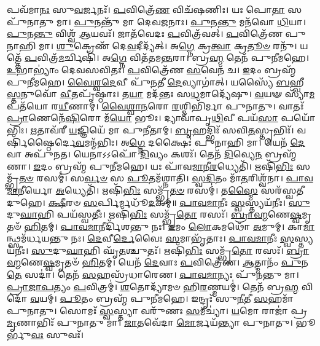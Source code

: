 𑌪𑌵᳴𑌮𑌾\-\ul{𑌨𑌃} 𑌸𑍁\-\ul{𑌵}\-𑌰𑍍𑌜𑌨𑌃᳴। \ul{𑌪}\-𑌵𑌿𑌤𑍍𑌰𑍇᳴\-\ul{𑌣} 𑌵𑌿𑌚᳴\ur{}𑌷𑌣𑌿𑌃। 𑌯𑌃 𑌪𑍋\-\ul{𑌤𑌾} 𑌸 𑌪𑍁᳴𑌨𑌾𑌤𑍁 𑌮𑌾। \ul{𑌪𑍁}\-𑌨𑌨𑍍𑌤𑍁᳴ 𑌮𑌾 𑌦𑍇𑌵\-\ul{𑌜}\-𑌨𑌾𑌃।
\-\ul{𑌪𑍁}\-𑌨\-\ul{𑌨𑍍𑌤𑍁} 𑌮𑌨᳴𑌵𑍋 \ul{𑌧𑌿}\-𑌯𑌾। \ul{𑌪𑍁}\-𑌨\-\ul{𑌨𑍍𑌤𑍁} 𑌵𑌿𑌶𑍍𑌵᳴ \ul{𑌆}\-𑌯𑌵𑌃᳴। 𑌜𑌾𑌤᳴𑌵𑍇𑌦𑌃 \ul{𑌪}\-𑌵𑌿𑌤𑍍𑌰᳴𑌵𑌤𑍍। \ul{𑌪}\-𑌵𑌿𑌤𑍍𑌰𑍇᳴𑌣 𑌪𑍁𑌨𑌾𑌹𑌿 𑌮𑌾।
\-\ul{𑌶𑍁}\-𑌕𑍍𑌰𑍇𑌣᳴ 𑌦𑍇\-\ul{𑌵}\-𑌦𑍀𑌦𑍍𑌯᳴𑌤𑍍। 𑌅\-\ul{𑌗𑍍𑌨𑍇} 𑌕𑍍𑌰\-\ul{𑌤𑍍𑌵𑌾} 𑌕𑍍𑌰\-\ul{𑌤𑍂}\-\-\ul{𑍞} 𑌰𑌨𑍁᳴। 𑌯𑌤𑍍𑌤𑍇᳴ \ul{𑌪}\-𑌵𑌿𑌤𑍍𑌰᳴\-\ul{𑌮}\-𑌰𑍍𑌚𑌿𑌷𑌿᳴। 𑌅\-\ul{𑌗𑍍𑌨𑍇} 𑌵𑌿𑌤᳴𑌤𑌮\-\ul{𑌨𑍍𑌤}\-𑌰𑌾।
𑌬𑍍𑌰\-\ul{𑌹𑍍𑌮} 𑌤𑍇𑌨᳴ 𑌪𑍁𑌨𑍀𑌮𑌹𑍇। \ul{𑌉}\-𑌭𑌾𑌭𑍍𑌯𑌾𑌂॑ 𑌦𑍇𑌵𑌸𑌵𑌿𑌤𑌃। \ul{𑌪}\-𑌵𑌿𑌤𑍍𑌰𑍇᳴𑌣 \ul{𑌸}\-𑌵𑍇𑌨᳴ 𑌚। \ul{𑌇}\-𑌦𑌂 𑌬𑍍𑌰𑌹𑍍𑌮᳴ 𑌪𑍁𑌨𑍀𑌮𑌹𑍇।
\-\ul{𑌵𑍈}\-\-\ul{𑌶𑍍𑌵}\-\-\ul{𑌦𑍇}\-𑌵𑍀 𑌪𑍁᳴\-\ul{𑌨}\-𑌤𑍀 \ul{𑌦𑍇}\-𑌵𑍍𑌯𑌾𑌗𑌾॑𑌤𑍍। 𑌯𑌸𑍍𑌯𑍈᳴ \ul{𑌬}\-𑌹𑍍𑌵𑍀\-\ul{𑌸𑍍𑌤}\-𑌨𑍁𑌵𑍋᳴ \ul{𑌵𑍀}\-𑌤𑌪𑍃᳴𑌷𑍍𑌠𑌾𑌃।
𑌤\-\ul{𑌯𑌾} 𑌮𑌦᳴𑌨𑍍𑌤𑌃 𑌸\-\ul{𑌧}\-𑌮𑌾𑌦𑍍𑌯𑍇᳴𑌷𑍁। \ul{𑌵}\-𑌯𑍟 𑌸𑍍𑌯𑌾᳴\-\ul{𑌮} 𑌪𑌤᳴𑌯𑍋 𑌰\-\ul{𑌯𑍀}\-𑌣𑌾𑌮𑍍।
\-\ul{𑌵𑍈}\-\-\ul{𑌶𑍍𑌵𑌾}\-\-\ul{𑌨}\-𑌰𑍋 \ul{𑌰}\-𑌶𑍍𑌮𑌿𑌭𑌿᳴𑌰𑍍𑌮𑌾 𑌪𑍁𑌨𑌾𑌤𑍁। 𑌵𑌾𑌤𑌃᳴ \ul{𑌪𑍍𑌰𑌾}\-𑌣𑍇𑌨𑍇᳴\-\ul{𑌷𑌿}\-𑌰𑍋 𑌮᳴\-\ul{𑌯𑍋} 𑌭𑍂𑌃।
𑌦𑍍𑌯𑌾𑌵𑌾᳴𑌪𑍃\-\ul{𑌥𑌿}\-𑌵𑍀 𑌪𑌯᳴\-\ul{𑌸𑌾} 𑌪𑌯𑍋᳴𑌭𑌿𑌃। \ul{𑌋}\-𑌤𑌾𑌵᳴𑌰𑍀 \ul{𑌯}\-𑌜𑍍𑌞𑌿𑌯𑍇᳴ 𑌮𑌾 𑌪𑍁𑌨𑍀𑌤𑌾𑌮𑍍।
\-\ul{𑌬𑍃}\-𑌹𑌦𑍍𑌭𑌿𑌃᳴ 𑌸𑌵𑌿\-\ul{𑌤}\-𑌸𑍍𑌤𑍃𑌭𑌿𑌃᳴। 𑌵𑌰𑍍{}𑌷𑌿᳴𑌷𑍍𑌠𑍈𑌰𑍍𑌦𑍇\-\ul{𑌵}\-𑌮𑌨𑍍𑌮᳴𑌭𑌿𑌃।
𑌅\-\ul{𑌗𑍍𑌨𑍇} 𑌦𑌕𑍍𑌷𑍈𑌃॑ 𑌪𑍁𑌨𑌾𑌹𑌿 𑌮𑌾। 𑌯𑍇𑌨᳴ \ul{𑌦𑍇}\-𑌵𑌾 𑌅𑌪𑍁᳴𑌨𑌤।
𑌯𑍇𑌨𑌾𑌽𑌽𑌪𑍋᳴ \ul{𑌦𑌿}\-𑌵𑍍𑌯𑌂 𑌕𑌶𑌃᳴। 𑌤𑍇𑌨᳴ \ul{𑌦𑌿}\-𑌵𑍍𑌯𑍇\-\ul{𑌨} 𑌬𑍍𑌰𑌹𑍍𑌮᳴𑌣𑌾। \ul{𑌇}\-𑌦𑌂 𑌬𑍍𑌰𑌹𑍍𑌮᳴ 𑌪𑍁𑌨𑍀𑌮𑌹𑍇। 𑌯𑌃 𑌪𑌾᳴𑌵\-\ul{𑌮𑌾}\-𑌨𑍀\-\ul{𑌰}\-𑌧𑍍𑌯𑍇𑌤𑌿᳴।
𑌋𑌷𑌿᳴\-\ul{𑌭𑌿𑌃} 𑌸𑌮𑍍𑌭𑍃᳴\-\ul{𑌤}\-\-\ul{𑍞} 𑌰𑌸𑌮𑍍॑। 𑌸\-\ul{𑌰𑍍𑌵}\-\-\ul{𑍞} 𑌸 \ul{𑌪𑍂}\-𑌤𑌮᳴𑌶𑍍𑌨𑌾𑌤𑌿।
\-\ul{𑌸𑍍𑌵}\-\-\ul{𑌦𑌿}\-𑌤𑌂 𑌮𑌾᳴\-\ul{𑌤}\-𑌰𑌿𑌶𑍍𑌵᳴𑌨𑌾। \ul{𑌪𑌾}\-\-\ul{𑌵}\-\-\ul{𑌮𑌾}\-𑌨𑍀𑌰𑍍𑌯𑍋 \ul{𑌅}\-𑌧𑍍𑌯𑍇𑌤𑌿᳴।
𑌋𑌷𑌿᳴\-\ul{𑌭𑌿𑌃} 𑌸𑌮𑍍𑌭𑍃᳴\-\ul{𑌤}\-\-\ul{𑍞} 𑌰𑌸𑌮𑍍॑। 𑌤\-\ul{𑌸𑍍𑌮𑍈} 𑌸𑌰᳴𑌸𑍍𑌵𑌤𑍀 𑌦𑍁𑌹𑍇। \ul{𑌕𑍍𑌷𑍀}\-𑌰𑍞 \ul{𑌸}\-𑌰𑍍𑌪𑌿𑌰𑍍𑌮𑌧𑍂᳴\-\ul{𑌦}\-𑌕𑌮𑍍॥
\-\ul{𑌪𑌾}\-\-\ul{𑌵}\-\-\ul{𑌮𑌾}\-𑌨𑍀𑌃 \ul{𑌸𑍍𑌵}\-𑌸𑍍𑌤𑍍𑌯𑌯᳴𑌨𑍀𑌃। \ul{𑌸𑍁}\-𑌦𑍁\-\ul{𑌘𑌾}\-𑌹𑌿 𑌪𑌯᳴𑌸𑍍𑌵𑌤𑍀𑌃।
𑌋𑌷𑌿᳴\-\ul{𑌭𑌿𑌃} 𑌸𑌮𑍍𑌭𑍃᳴\-\ul{𑌤𑍋} 𑌰𑌸𑌃᳴। \ul{𑌬𑍍𑌰𑌾}\-\-\ul{𑌹𑍍𑌮}\-𑌣𑍇\-\ul{𑌷𑍍𑌵}\-𑌮𑍃𑌤𑍞᳴ \ul{𑌹𑌿}\-𑌤𑌮𑍍।
\-\ul{𑌪𑌾}\-\-\ul{𑌵}\-\-\ul{𑌮𑌾}\-𑌨𑍀𑌰𑍍𑌦𑌿᳴𑌶𑌨𑍍𑌤𑍁 𑌨𑌃। \ul{𑌇}\-𑌮𑌂 \ul{𑌲𑍋}\-𑌕𑌮𑌥𑍋᳴ \ul{𑌅}\-𑌮𑍁𑌮𑍍।
𑌕𑌾\-\ul{𑌮𑌾}\-𑌨𑍍𑌥𑍍𑌸𑌮᳴𑌰𑍍𑌧𑌯𑌨𑍍𑌤𑍁 𑌨𑌃। \ul{𑌦𑍇}\-𑌵𑍀\-\ul{𑌰𑍍𑌦𑍇}\-𑌵𑍈𑌃 \ul{𑌸}\-𑌮𑌾𑌭𑍃᳴𑌤𑌾𑌃।
\-\ul{𑌪𑌾}\-\-\ul{𑌵}\-\-\ul{𑌮𑌾}\-𑌨𑍀𑌃 \ul{𑌸𑍍𑌵}\-𑌸𑍍𑌤𑍍𑌯𑌯᳴𑌨𑍀𑌃। \ul{𑌸𑍁}\-𑌦𑍁\-\ul{𑌘𑌾}\-𑌹𑌿 𑌘𑍃᳴\-\ul{𑌤}\-𑌶𑍍𑌚𑍁𑌤𑌃᳴।
𑌋𑌷𑌿᳴\-\ul{𑌭𑌿𑌃} 𑌸𑌮𑍍𑌭𑍃᳴\-\ul{𑌤𑍋} 𑌰𑌸𑌃᳴। \ul{𑌬𑍍𑌰𑌾}\-\-\ul{𑌹𑍍𑌮}\-𑌣𑍇\-\ul{𑌷𑍍𑌵}\-𑌮𑍃𑌤𑍞᳴ \ul{𑌹𑌿}\-𑌤𑌮𑍍।
𑌯𑍇𑌨᳴ \ul{𑌦𑍇}\-𑌵𑌾𑌃 \ul{𑌪}\-𑌵𑌿𑌤𑍍𑌰𑍇᳴𑌣। \ul{𑌆}\-𑌤𑍍𑌮𑌾𑌨𑌂᳴ \ul{𑌪𑍁}\-𑌨\-\ul{𑌤𑍇} 𑌸𑌦𑌾॑।
𑌤𑍇𑌨᳴ \ul{𑌸}\-𑌹𑌸𑍍𑌰᳴𑌧𑌾𑌰𑍇𑌣। \ul{𑌪𑌾}\-\-\ul{𑌵}\-\-\ul{𑌮𑌾}\-𑌨𑍍𑌯𑌃 𑌪𑍁᳴𑌨𑌨𑍍𑌤𑍁 𑌮𑌾।
\-\ul{𑌪𑍍𑌰𑌾}\-\-\ul{𑌜𑌾}\-\-\ul{𑌪}\-𑌤𑍍𑌯𑌂 \ul{𑌪}\-𑌵𑌿𑌤𑍍𑌰𑌮𑍍॑। \ul{𑌶}\-𑌤𑍋𑌦𑍍𑌯𑌾᳴𑌮𑍞 𑌹𑌿\-\ul{𑌰}\-𑌣𑍍𑌮𑌯𑌮𑍍॑।
𑌤𑍇𑌨᳴ 𑌬𑍍𑌰\-\ul{𑌹𑍍𑌮} 𑌵𑌿𑌦𑍋᳴ \ul{𑌵}\-𑌯𑌮𑍍। \ul{𑌪𑍂}\-𑌤𑌂 𑌬𑍍𑌰𑌹𑍍𑌮᳴ 𑌪𑍁𑌨𑍀𑌮𑌹𑍇।
𑌇𑌨𑍍𑌦𑍍𑌰𑌃᳴ 𑌸𑍁\-\ul{𑌨𑍀}\-𑌤𑍀 \ul{𑌸}\-𑌹𑌮𑌾᳴ 𑌪𑍁𑌨𑌾𑌤𑍁। 𑌸𑍋𑌮𑌃᳴ \ul{𑌸𑍍𑌵}\-𑌸𑍍𑌤𑍍𑌯𑌾 𑌵𑌰𑍁᳴𑌣𑌃 \ul{𑌸}\-𑌮𑍀𑌚𑍍𑌯𑌾॑।
\-\ul{𑌯}\-𑌮𑍋 𑌰𑌾𑌜𑌾॑ 𑌪𑍍𑌰\-\ul{𑌮𑍃}\-𑌣𑌾𑌭𑌿𑌃᳴ 𑌪𑍁𑌨𑌾𑌤𑍁 𑌮𑌾। \ul{𑌜𑌾}\-𑌤𑌵𑍇᳴𑌦𑌾 \ul{𑌮𑍋}\-𑌰𑍍𑌜𑌯᳴𑌨𑍍𑌤𑍍𑌯𑌾 𑌪𑍁𑌨𑌾𑌤𑍁। 𑌭𑍂𑌰𑍍𑌭𑍁\-\ul{𑌵𑌃} 𑌸𑍁𑌵𑌃᳴।

